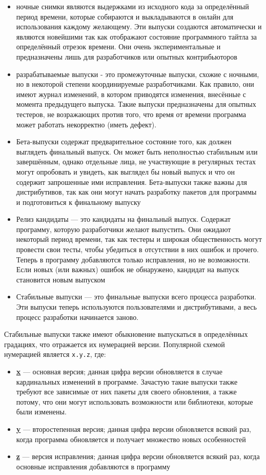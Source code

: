 \documentclass[12pt]{book}
\begin{document}
\begin{itemize}
	\item ночные  снимки являются выдержками из исходного кода за определённый период времени, которые собираются и выкладываются в онлайн для использования каждому желающему. Эти выпуски создаются автоматически и являются новейшими так как отображают состояние программного тайтла за определённый отрезок времени. Они очень экспериментальные и предназначены лишь для разработчиков или опытных контрибьюторов
	\item разрабатываемые выпуски  - это промежуточные выпуски, схожие с ночными, но в некоторой степени координируемые разработчиками. Как правило, они имеют журнал изменений, в котором приводятся изменения, внесённые с момента предыдущего выпуска. Такие выпуски предназначены для опытных тестеров, не возражающих против того, что время от времени программа может работать некорректно (иметь дефект).
	\item Бета-выпуски содержат предварительное состояние того, как должен выглядеть финальный выпуск. Он может быть неполностью стабильным или завершённым, однако отдельные лица, не участвующие в регулярных тестах могут опробовать и увидеть, как выглядел бы новый выпуск и что он содержит запрошенные ими исправления. Бета-выпуски также важны для дистрибутивов, так как они могут начать разработку пакетов для программы и подготовиться к финальному выпуску
	\item Релиз кандидаты — это кандидаты на финальный выпуск.  Содержат программу, которую разработчики желают выпустить. Они ожидают некоторый период времени, так как тестеры и широкая общественность могут провести свои тесты, чтобы убедиться в отсутствии в них ошибок и прочего. Теперь в программу добавляются только исправления, но не возможности. Если новых (или важных) ошибок  не обнаружено, кандидат на выпуск становится новым выпуском
	\item Стабильные выпуски — это финальные выпуски всего процесса разработки. Эти выпуски теперь используются пользователями и дистрибутивами, а весь процесс разработки начинается заново.
\end{itemize}

Стабильные выпуски также имеют обыкновение выпускаться в определённых градациях, что отражается их нумерацией версии. Популярной схемой нумерацией является \texttt{x.y.z}, где: 

\begin{itemize}
	\item \underline{\textbf{x}} --- основная версия; данная цифра версии обновляется в случае кардинальных изменений в программе.  Зачастую такие выпуски также требуют все зависимые от них пакеты для своего обновления, а также потому, что они могут использовать возможности или библиотеки, которые были изменены.
	\item \underline{\textbf{y}}  --- второстепенная версия;  данная цифра версии обновляется всякий раз, когда программа обновляется и получает множество новых особенностей
	\item \underline{\textbf{z}} — версия исправления;  данная цифра версии обновляется всякий раз, когда основные исправления добавляются в программу
\end{itemize}
\end{document}
